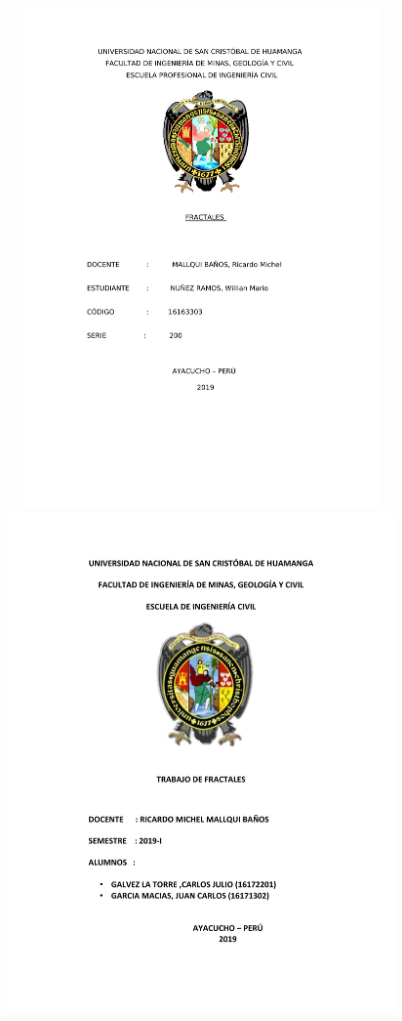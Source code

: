 \documentclass[12pt,]{report}
\begin{document}
\includegraphics[width=1\textwidth,height=5.20833in]{222.pdf}
\includegraphics[width=1\textwidth,height=5.20833in]{555.pdf}
\end{document}
